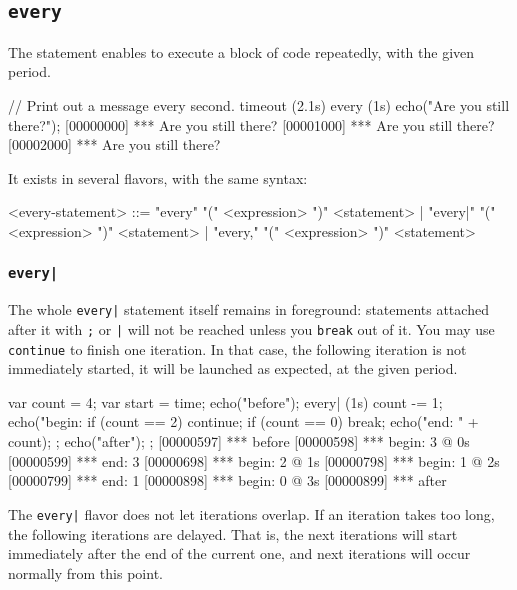 \subsection{\lstinline'every'}
\label{sec:lang:every}
The  statement enables to execute a block of code
repeatedly, with the given period.

\begin{urbiscript}
// Print out a message every second.
timeout (2.1s)
  every (1s)
    echo("Are you still there?");
[00000000] *** Are you still there?
[00001000] *** Are you still there?
[00002000] *** Are you still there?
\end{urbiscript}

It exists in several flavors, with the same syntax:

\begin{bnf}
<every-statement>
  ::= "every"  "(" <expression> ")" <statement>
    | "every|" "(" <expression> ")" <statement>
    | "every," "(" <expression> ")" <statement>
\end{bnf}

\subsubsection{\lstinline'every|'}
The whole \lstinline'every|' statement itself remains in foreground:
statements attached after it with \lstinline';' or \lstinline'|' will
not be reached unless you \lstinline'break' out of it.  You may use
\lstinline|continue| to finish one iteration.  In that case, the
following iteration is not immediately started, it will be launched as
expected, at the given period.

\begin{urbiscript}
{
  var count = 4;
  var start = time;
  echo("before");
  every| (1s)
  {
    count -= 1;
    echo("begin: %
    if (count == 2)
      continue;
    if (count == 0)
      break;
    echo("end:   " + count);
  };
  echo("after");
};
[00000597] *** before
[00000598] *** begin: 3 @ 0s
[00000599] *** end:   3
[00000698] *** begin: 2 @ 1s
[00000798] *** begin: 1 @ 2s
[00000799] *** end:   1
[00000898] *** begin: 0 @ 3s
[00000899] *** after
\end{urbiscript}

The \lstinline{every|} flavor does not let iterations overlap. If an
iteration takes too long, the following iterations are delayed. That
is, the next iterations will start immediately after the end of the
current one, and next iterations will occur normally from this point.

